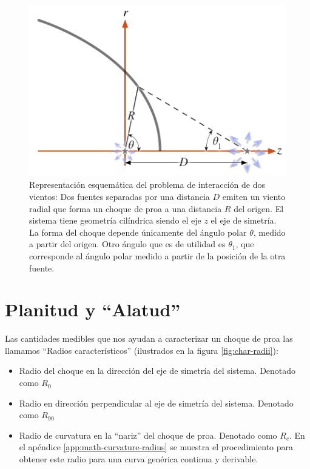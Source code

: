 \begin{figure}
  \includegraphics[width=0.5\linewidth]{./Figures/bowshock-crw-variables}
  \caption{Representación esquemática del problema de interacción de dos vientos: Dos fuentes separadas por una distancia $D$ emiten un viento radial que forma un choque de proa a una distancia $R$ del origen. El sistema tiene geometría cilíndrica siendo el eje $z$ el eje de simetría. La forma del choque depende únicamente del ángulo polar $\theta$, medido a partir del origen. Otro ángulo que es de utilidad es $\theta_1$, que corresponde al ángulo polar medido a partir de la posición de la otra fuente.}
    \label{fig:crw-esquema}
\end{figure}

\section{Planitud y ``Alatud''}
\label{sec:char-rad}
Las cantidades medibles que nos ayudan a caracterizar un choque de proa las llamamos ``Radios característicos'' (ilustrados en la figura \ref{fig:char-radii}):
\begin{itemize}
\item Radio del choque en la dirección del eje de simetría del sistema. Denotado como $R_0$
\item Radio en dirección perpendicular al eje de simetría del sistema. Denotado como $R_{90}$
\item Radio de curvatura en la ``nariz'' del choque de proa. Denotado como $R_c$. En el apéndice \ref{app:math-curvature-radius} se muestra el procedimiento para obtener este radio para una curva genérica continua y derivable.
\end{itemize}


